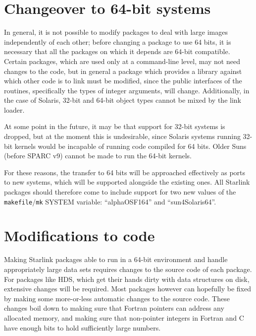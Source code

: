 \documentclass[twoside,11pt]{article}
\newcommand{\xref}[3]{#1}
\renewcommand{\_}{\texttt{\symbol{95}}}
\newcommand{\file}[1]{{\tt #1}}
\begin{document}
\section{Changeover to 64-bit systems\label{sec:changeover}}

In general, it is not possible to modify packages to deal with large
images independently of each other;
before changing a package to use 64 bits, it is necessary
that all the packages on which it depends are 64-bit compatible.
Certain packages, which are used only at a command-line level,
may not need changes to the code, but in general
a package which provides a library
against which other code is to link must be modified,
since the public interfaces of the routines,
specifically the types of integer arguments, will change.
Additionally, in the case of Solaris,
32-bit and 64-bit object types cannot be mixed by the link loader.

At some point in the future, it may be that support for 32-bit systems
is dropped, but at the moment this is undesirable, since
Solaris systems running 32-bit kernels would be incapable of running
code compiled for 64 bits.
Older Suns (before SPARC v9) cannot be made to run the 64-bit kernels.

For these reasons, the transfer to 64 bits will be approached
effectively as ports to new systems, which will be supported
alongside the existing ones.  All Starlink packages should
therefore come to
include support for two new values of the \file{makefile}/\file{mk}
SYSTEM variable: ``alpha\_OSF1\_64'' and ``sun4\_Solaris\_64''.



\section{Modifications to code\label{sec:modificienda}}

Making Starlink packages able to run in a 64-bit environment and
handle appropriately large data sets requires changes to the source
code of each package.
For packages like \xref{HDS}{sun92}{},
which get their hands dirty with data structures on disk,
extensive changes will be required.
Most packages however can hopefully be fixed by making some more-or-less
automatic changes to the source code.
These changes boil down to making sure that Fortran pointers
can address any allocated memory,
and making sure that non-pointer integers in Fortran and C
have enough bits to hold sufficiently large numbers.
\end{document}
